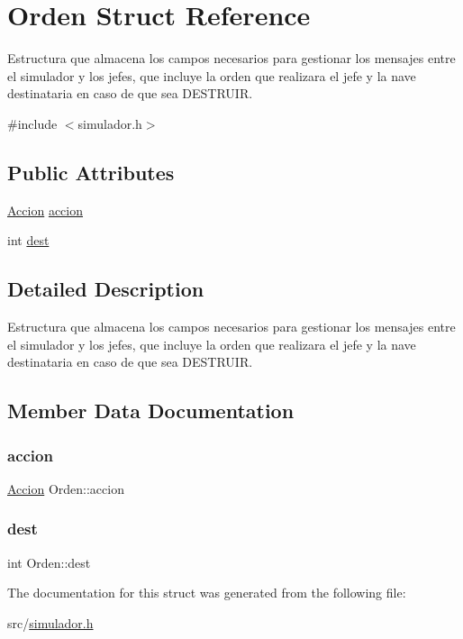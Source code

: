 \hypertarget{structOrden}{}\section{Orden Struct Reference}
\label{structOrden}


Estructura que almacena los campos necesarios para gestionar los mensajes entre el simulador y los jefes, que incluye la orden que realizara el jefe y la nave destinataria en caso de que sea D\+E\+S\+T\+R\+U\+IR.  




{\ttfamily \#include $<$simulador.\+h$>$}

\subsection*{Public Attributes}
\begin{DoxyCompactItemize}
\item 
\hyperlink{simulador_8h_abddf580b360dbb86fa351f5a944ff315}{Accion} \hyperlink{structOrden_a9e7f5ca2513e5327875fb9aa1f59aa2b}{accion}
\item 
int \hyperlink{structOrden_a9c7a429d1afc1900921202e5152c9057}{dest}
\end{DoxyCompactItemize}


\subsection{Detailed Description}
Estructura que almacena los campos necesarios para gestionar los mensajes entre el simulador y los jefes, que incluye la orden que realizara el jefe y la nave destinataria en caso de que sea D\+E\+S\+T\+R\+U\+IR. 

\subsection{Member Data Documentation}
\mbox{\label{structOrden_a9e7f5ca2513e5327875fb9aa1f59aa2b}} 
\subsubsection{\texorpdfstring{accion}{accion}}
{\footnotesize\ttfamily \hyperlink{simulador_8h_abddf580b360dbb86fa351f5a944ff315}{Accion} Orden\+::accion}

\mbox{\label{structOrden_a9c7a429d1afc1900921202e5152c9057}} 
\subsubsection{\texorpdfstring{dest}{dest}}
{\footnotesize\ttfamily int Orden\+::dest}



The documentation for this struct was generated from the following file\+:\begin{DoxyCompactItemize}
\item 
src/\hyperlink{simulador_8h}{simulador.\+h}\end{DoxyCompactItemize}
